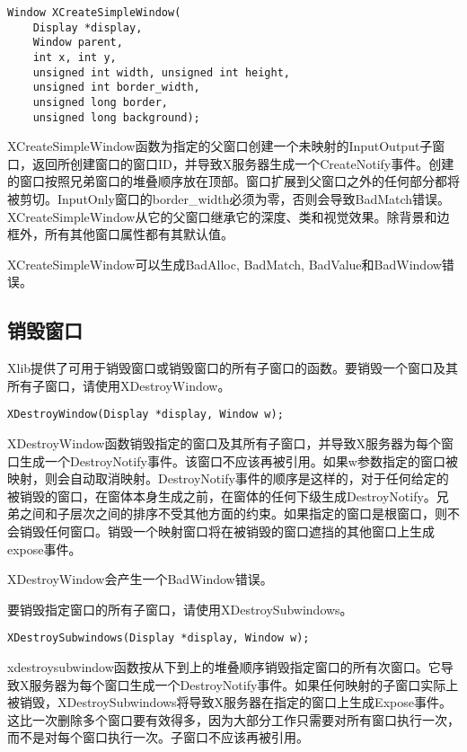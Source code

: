 \begin{lstlisting}
Window XCreateSimpleWindow(
	Display *display,
	Window parent,
	int x, int y,
	unsigned int width, unsigned int height,
	unsigned int border_width,
	unsigned long border,
	unsigned long background);
\end{lstlisting}

XCreateSimpleWindow函数为指定的父窗口创建一个未映射的InputOutput子窗口，返回所创建窗口的窗口ID，并导致X服务器生成一个CreateNotify事件。创建的窗口按照兄弟窗口的堆叠顺序放在顶部。窗口扩展到父窗口之外的任何部分都将被剪切。InputOnly窗口的border\_width必须为零，否则会导致BadMatch错误。XCreateSimpleWindow从它的父窗口继承它的深度、类和视觉效果。除背景和边框外，所有其他窗口属性都有其默认值。

\begin{note}
XCreateSimpleWindow可以生成BadAlloc, BadMatch, BadValue和BadWindow错误。
\end{note}

\subsection{销毁窗口}

Xlib提供了可用于销毁窗口或销毁窗口的所有子窗口的函数。要销毁一个窗口及其所有子窗口，请使用XDestroyWindow。

\begin{lstlisting}
XDestroyWindow(Display *display, Window w);
\end{lstlisting}

XDestroyWindow函数销毁指定的窗口及其所有子窗口，并导致X服务器为每个窗口生成一个DestroyNotify事件。该窗口不应该再被引用。如果w参数指定的窗口被映射，则会自动取消映射。DestroyNotify事件的顺序是这样的，对于任何给定的被销毁的窗口，在窗体本身生成之前，在窗体的任何下级生成DestroyNotify。兄弟之间和子层次之间的排序不受其他方面的约束。如果指定的窗口是根窗口，则不会销毁任何窗口。销毁一个映射窗口将在被销毁的窗口遮挡的其他窗口上生成expose事件。

\noindent XDestroyWindow会产生一个BadWindow错误。

\noindent 要销毁指定窗口的所有子窗口，请使用XDestroySubwindows。

\begin{lstlisting}
XDestroySubwindows(Display *display, Window w);
\end{lstlisting}

xdestroysubwindow函数按从下到上的堆叠顺序销毁指定窗口的所有次窗口。它导致X服务器为每个窗口生成一个DestroyNotify事件。如果任何映射的子窗口实际上被销毁，XDestroySubwindows将导致X服务器在指定的窗口上生成Expose事件。这比一次删除多个窗口要有效得多，因为大部分工作只需要对所有窗口执行一次，而不是对每个窗口执行一次。子窗口不应该再被引用。


